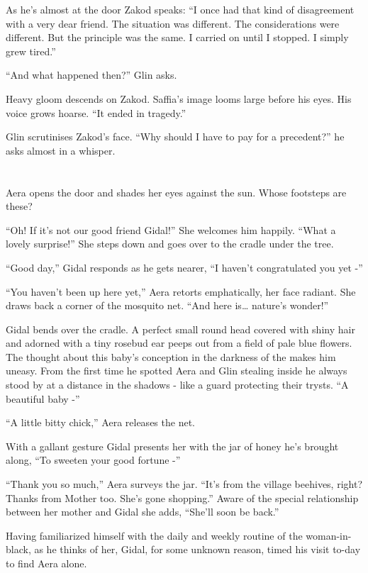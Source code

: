 \documentclass[twoside,11pt]{book}
\begin{document}
As he's almost at the door Zakod speaks: ``I once had that kind of disagreement with a very dear friend.
The situation was different. The considerations were different. But the principle was the same. I carried on until I
stopped. I simply grew tired.''

``And what happened then?'' Glin asks.

Heavy gloom descends on Zakod. Saffia's image looms large before his eyes. His voice grows hoarse. ``It
ended in tragedy.''

Glin scrutinises Zakod's face. ``Why should I have to pay for a
precedent?'' he asks almost in a whisper.



\chapter{}

Aera opens the door and shades her eyes against the sun. Whose footsteps are these?

``Oh! If it's not our good friend Gidal!'' She welcomes him happily. ``What a
lovely surprise!'' She steps down and goes over to the
cradle under the tree.

``Good day,'' Gidal responds as he gets nearer, ``I haven't congratulated you yet
-''

``You haven't been up here yet,'' Aera retorts emphatically, her face radiant. She draws back
a corner of the mosquito net. ``And here is{\dots} nature's wonder!''

Gidal bends over the cradle. A perfect small round head covered with shiny hair and adorned with a tiny rosebud ear
peeps out from a field of pale blue flowers. The thought about this baby's conception in the darkness of the makes
him uneasy.  From the first time he spotted Aera and Glin stealing inside he always stood by at a distance in the
shadows - like a guard protecting their trysts. ``A beautiful baby -''

``A little bitty chick,'' Aera releases the net.

With a gallant gesture Gidal presents her with the jar of honey he's brought along, ``To sweeten your good
fortune -''

``Thank you so much,'' Aera surveys the jar. ``It's from the village beehives,
right? Thanks from Mother too. She's gone shopping.'' Aware of the special relationship between her mother
and Gidal she adds, ``She'll soon be back.''

Having familiarized himself with the daily and weekly routine of the woman-in-black, as he thinks of her, Gidal, for
some unknown reason, timed his visit to-day to find Aera alone.
\end{document}
